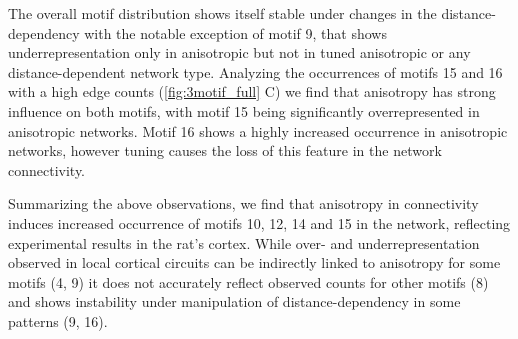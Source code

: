 The overall motif distribution shows itself stable under changes in
the distance-dependency with the notable exception of motif 9, that
shows underrepresentation only in anisotropic but not in tuned
anisotropic or any distance-dependent network type. Analyzing the
occurrences of motifs 15 and 16 with a high edge counts
(\autoref{fig:3motif_full} C) we find that anisotropy has strong
influence on both motifs, with motif 15 being significantly
overrepresented in anisotropic networks. Motif 16 shows a highly
increased occurrence in anisotropic networks, however tuning causes
the loss of this feature in the network connectivity.

Summarizing the above observations, we find that  anisotropy in connectivity induces increased occurrence of
motifs 10, 12, 14 and 15 in the network, reflecting experimental
results in the rat's cortex.  While over- and underrepresentation
observed in local cortical circuits can be indirectly linked to
anisotropy for some motifs (4, 9) it does not accurately reflect
observed counts for other motifs (8) and shows instability under
manipulation of distance-dependency in some patterns (9, 16).












